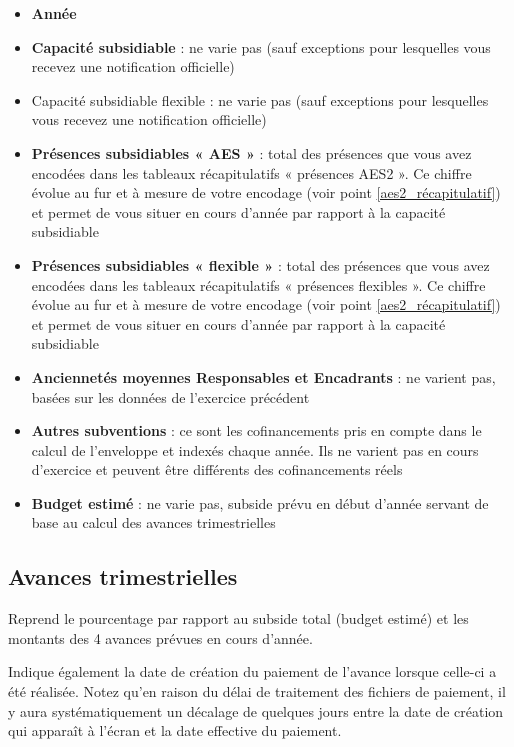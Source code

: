 \begin{itemize}
    \item \textbf{Année}
    \item \textbf{Capacité subsidiable} : ne varie pas (sauf exceptions pour lesquelles vous recevez une notification officielle)
    \item Capacité subsidiable flexible : ne varie pas (sauf exceptions pour lesquelles vous recevez une notification officielle)
    \item \textbf{Présences subsidiables « AES »} : total des présences que vous avez encodées dans les tableaux récapitulatifs « présences AES2 ». Ce chiffre évolue au fur et à mesure de votre encodage (voir point \ref{aes2_récapitulatif}) et permet de vous situer en cours d’année par rapport à la capacité subsidiable
    \item \textbf{Présences subsidiables « flexible »} : total des présences que vous avez encodées dans les tableaux récapitulatifs « présences flexibles ». Ce chiffre évolue au fur et à mesure de votre encodage (voir point \ref{aes2_récapitulatif}) et permet de vous situer en cours d’année par rapport à la capacité subsidiable
    \item \textbf{Anciennetés moyennes Responsables et Encadrants} : ne varient pas, basées sur les données de l’exercice précédent 
    \item \textbf{Autres subventions} : ce sont les cofinancements pris en compte dans le calcul de l’enveloppe et indexés chaque année. Ils ne varient pas en cours d’exercice et peuvent être différents des cofinancements réels
    \item \textbf{Budget estimé} : ne varie pas, subside prévu en début d’année servant de base au calcul des avances trimestrielles
\end{itemize}

\subsection{Avances trimestrielles}
Reprend le pourcentage par rapport au subside total (budget estimé) et les montants des 4 avances prévues en cours d’année.  

Indique également la date de création du paiement de l’avance lorsque celle-ci a été réalisée. Notez qu’en raison du délai de traitement des fichiers de paiement, il y aura systématiquement un décalage de quelques jours entre la date de création qui apparaît à l’écran et la date effective du paiement.

